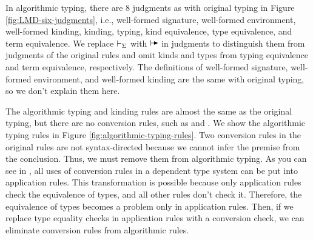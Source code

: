 


In algorithmic typing, there are 8 judgments as with original typing in Figure
\ref{fig:LMD-six-judgments}, i.e., well-formed signature, well-formed
environment, well-formed kinding, kinding, typing, kind equivalence, type
equivalence, and term equivalence. We replace \( \vdash_\Sigma \) with \( \AV \) in
judgments to distinguish them from judgments of the original rules and omit
kinds and types from typing equivalence and term equivalence, respectively. The
definitions of well-formed signature, well-formed environment, and well-formed
kinding are the same with original typing, so we don't explain them here.


The algorithmic typing and kinding rules are almost the same as the original
typing, but there are no conversion rules, such as \TConv and \KConv. We show
the algorithmic typing rules in Figure \ref{fig:algorithmic-typing-rules}. Two
conversion rules in the original rules are not syntax-directed because we
cannot infer the premise from the conclusion. Thus, we must remove them from
algorithmic typing.  As you can see in \cite{benjamin2005attapldependent}, all
uses of conversion rules in a dependent type system can be put into application
rules. This transformation is possible because only application rules check the
equivalence of types, and all other rules don't check it. Therefore, the
equivalence of types becomes a problem only in application rules. Then, if we
replace type equality checks in application rules with a conversion check, we
can eliminate conversion rules from algorithmic rules.

